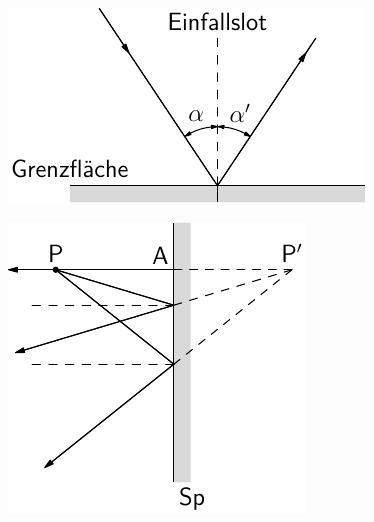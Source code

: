 \documentclass{scrreprt}
\begin{document}
\includegraphics{asy/demo/demomirror.pdf}

\includegraphics{asy/demo/demoverticalmirror.pdf}
\end{document}

